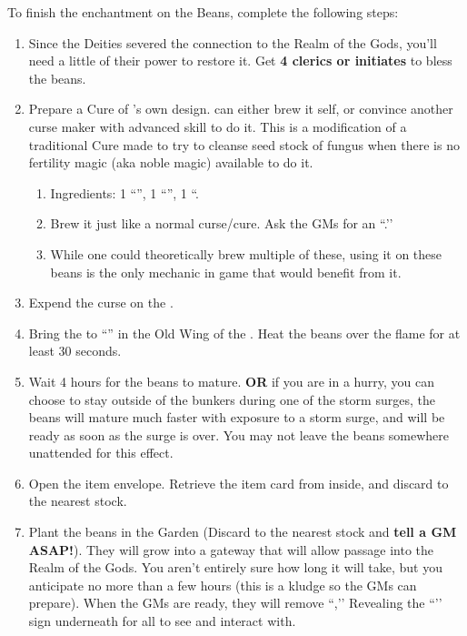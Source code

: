 \documentclass[green]{GL2020}
\begin{document}
To finish the enchantment on the Beans, complete the following steps:
\begin{enumerate}
  \item Since the Deities severed the connection to the Realm of the Gods, you’ll need a little of their power to restore it. Get \textbf{4 clerics or initiates} to bless the beans. 
  \item Prepare a Cure of \cCurse{}’s own design. \cCurse{} can either brew it \cCurse{\them}self, or convince another curse maker with advanced skill to do it. This is a modification of a traditional Cure made to try to cleanse seed stock of fungus when there is no fertility magic (aka noble magic) available to do it.
  \begin{enumerate}
    \item Ingredients: 1 ``\iHollyhock{}'', 1 ``\iLiveFish{}'', 1 ``\iClay{}.
    \item Brew it just like a normal curse/cure. Ask the GMs for an ``\iEyeOfVulture{}.’’ 
    \item While one could theoretically brew multiple of these, using it on these beans is the only mechanic in game that would benefit from it.
  \end{enumerate}
  \item Expend the curse on the \iBeansNB{}.
  \item Bring the \iBeansNB{} to ``\sPFlameOne{}'' in the Old Wing of the \pSc{}. Heat the beans over the flame for at least 30 seconds.
  \item Wait 4 hours for the beans to mature. \textbf{OR} if you are in a hurry, you can choose to stay outside of the bunkers during one of the storm surges, the beans will mature much faster with exposure to a storm surge, and will be ready as soon as the surge is over. You may not leave the beans somewhere unattended for this effect.
  \item Open the \iBeansNB{} item envelope. Retrieve the \iBeansMB{} item card from inside, and discard \iBeansNB{} to the nearest stock.
  \item Plant the beans in the Garden (Discard \iBeansMB{} to the nearest stock and \textbf{tell a GM ASAP!}). They will grow into a gateway that will allow passage into the Realm of the Gods. You aren’t entirely sure how long it will take, but you anticipate no more than a few hours (this is a kludge so the GMs can prepare). When the GMs are ready, they will remove ``\sSignB{},’’ Revealing the ``\sMagicPortal{}’’ sign underneath for all to see and interact with.
\end{enumerate}
\end{document}
